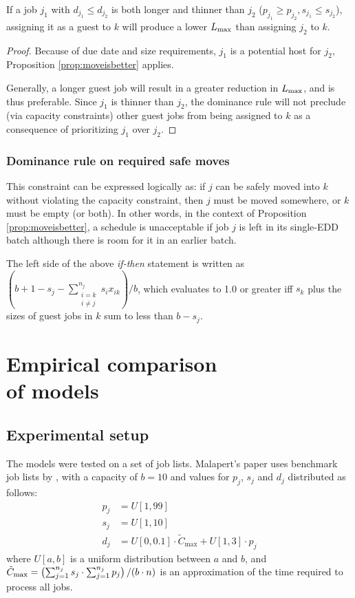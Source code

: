 \documentclass[13pt, letterpaper, oneside]{book}
\begin{document}
\begin{proposition} If a job $j_1$ with $d_{j_1} \leq d_{j_2}$ is both longer
and thinner than $j_2$ ($p_{j_1} \geq p_{j_2}, s_{j_1} \leq s_{j_2}$), assigning
it as a guest to $k$ will produce a lower $L_{\text{max}}$ than assigning $j_2$ to $k$.

\begin{proof}
Because of due date and size requirements, $j_1$ is a potential host for $j_2$,
Proposition \ref{prop:moveisbetter} applies. 

Generally, a longer guest job will result in a greater reduction in $L_{\text{max}}$, and
is thus preferable. Since $j_1$ is thinner than $j_2$, the dominance rule will
not preclude (via capacity constraints) other guest jobs from being assigned to
$k$ as a consequence of prioritizing $j_1$ over $j_2$.
\end{proof}
\end{proposition}

\subsection{Dominance rule on required safe moves}
This constraint can be expressed logically as: if $j$ can be safely moved into $k$
without violating the capacity constraint, then $j$ must be moved somewhere, or
$k$ must be empty (or both). In other words, in the context of Proposition
\ref{prop:moveisbetter}, a schedule is unacceptable if job $j$ is left in its
single-EDD batch although there is room for it in an earlier batch.

The left side of the above \textit{if-then} statement is written as $(b + 1 -
s_j - \sum_{\substack{{i = k}\\{i \neq j}}}^{n_j} s_i x_{ik}) / b$, which
evaluates to 1.0 or greater iff $s_k$ plus the sizes of guest jobs in $k$ sum to
less than $b - s_j$.




\chapter[Empirical comparison of models]{Empirical comparison\\ of models}
\section{Experimental setup}
The models were tested on a set of job lists. Malapert's paper uses benchmark
job lists by \citet{Daste1, Daste2}, with a capacity of $b = 10$ and values for
$p_j$, $s_j$ and $d_j$ distributed as follows:
\begin{align}
p_j &= U[1, 99] \\
s_j &= U[1, 10] \\
d_j &= U[0, 0.1] \cdot \tilde{C}_\text{max} + U[1, 3] \cdot p_j
\end{align}
where $U[a, b]$ is a uniform distribution between $a$ and $b$, and $\tilde{C}_\text{max} = \left( \sum_{j=1}^{n_j} s_j \cdot \sum_{j=1}^{n_j}
p_j \right) /\\ (b \cdot n)$ is an approximation of the time required to process
all jobs.
\end{document}
